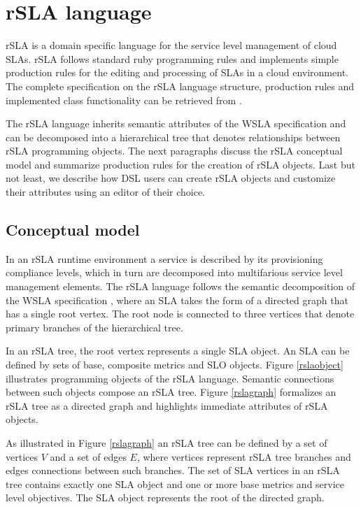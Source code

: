 \section{rSLA language}

rSLA is a domain specific language for the service level management of cloud SLAs. rSLA follows standard ruby programming rules and implements simple production rules for the editing and processing of SLAs in a cloud environment. The complete specification on the rSLA language structure, production rules and implemented class functionality can be retrieved from \cite{rSLAspec}.

The rSLA language inherits semantic attributes of the WSLA specification \cite{wsla} and can be decomposed into a hierarchical tree that denotes relationships between rSLA programming objects. 
 The next paragraphs discuss the rSLA conceptual model and summarize production rules for the creation of rSLA objects. Last but not least, we describe how DSL users can create rSLA objects and customize their attributes using an editor of their choice. 


\subsection{Conceptual model}
In an rSLA runtime environment a service is described by its provisioning compliance levels, which in turn are decomposed into multifarious service level management elements. The rSLA language follows the semantic decomposition of the WSLA specification \cite{wsla}, where an SLA takes the form of a directed graph that has a single root vertex. The root node is connected to three vertices that denote primary branches of the hierarchical tree. 

In an rSLA tree, the root vertex represents a single SLA object. An SLA can be defined by sets of base, composite metrics and SLO objects. Figure \ref{rslaobject} illustrates programming objects of the rSLA language. Semantic connections between such objects compose an rSLA tree. Figure \ref{rslagraph} formalizes an rSLA tree as a directed graph and highlights immediate attributes of rSLA objects.

As illustrated in Figure \ref{rslagraph} an rSLA tree can be defined by a set of vertices $V$ and a set of edges $E$, where vertices represent rSLA tree branches and edges connections between such branches. The set of SLA vertices in an rSLA tree contains exactly one SLA object and one or more base metrics and service level objectives. The SLA object represents the root of the directed graph. 

